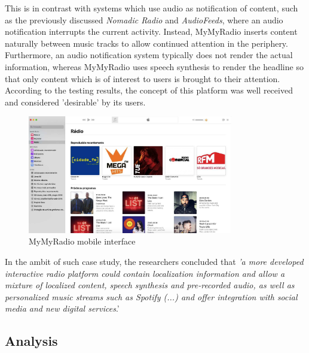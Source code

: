 This is in contrast with systems which use audio as notification of content, such as the previously discussed \textit{Nomadic Radio} and \textit{AudioFeeds}, where an audio notification interrupts the current activity. Instead, MyMyRadio inserts content naturally between music tracks to allow continued attention in the periphery. Furthermore, an audio notification system typically does not render the actual information, whereas MyMyRadio uses speech synthesis to render the headline so that only content which is of interest to users is brought to their attention. According to the testing results, the concept of this platform was well received and considered 'desirable' by its users.

\begin{figure}[h]
\centering
\includegraphics[width=0.8\textwidth]{./Images/applemusic.png}
\caption{MyMyRadio mobile interface}
\label{fig:test_env}
\end{figure}

In the ambit of such case study, the researchers concluded that \textit{'a more developed interactive radio platform could contain localization information and allow a mixture of localized content, speech synthesis and pre-recorded audio, as well as personalized music streams such as Spotify (...) and offer integration with social media and new digital services}.'


\subsection{Analysis}



